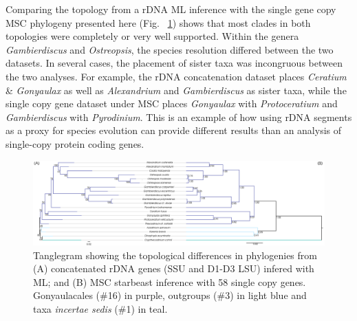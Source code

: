 \documentclass[12pt]{article}
\begin{document}
Comparing the topology from a rDNA ML inference with the single gene copy MSC phylogeny presented here (Fig. ~\ref{fig:tanglerDNA}) shows that most clades in both topologies were completely or very well supported. 
Within the genera \emph{Gambierdiscus} and \emph{Ostreopsis}, the species resolution differed between the two datasets. 
In several cases, the placement of sister taxa was incongruous between the two analyses. 
For example, the rDNA concatenation dataset places \emph{Ceratium} \& \emph{Gonyaulax} as well as \emph{Alexandrium} and \emph{Gambierdiscus} as sister taxa, while the single copy gene dataset under MSC places \emph{Gonyaulax} with \emph{Protoceratium} and \emph{Gambierdiscus} with \emph{Pyrodinium}. 
This is an example of how using rDNA segments as a proxy for species evolution can provide different results than an analysis of single-copy protein coding genes.

\begin{figure} 
\includegraphics[scale=.2]{figures/MSC-BI_vs_rDNA-ML.png} 
\caption{Tanglegram showing the topological differences in phylogenies from (A) concatenated rDNA genes (SSU and D1-D3 LSU) infered with ML; and (B) MSC starbeast inference with 58 single copy genes. Gonyaulacales (\#16) in purple, outgroups (\#3) in light blue and taxa \textit{incertae sedis} (\#1) in teal.} 
\label{fig:tanglerDNA}
\end{figure} 
\FloatBarrier
\end{document}
